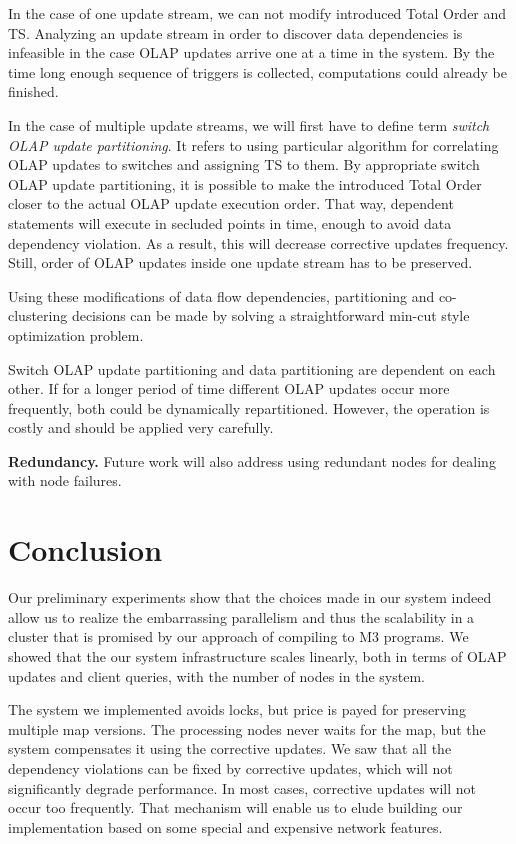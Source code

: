\documentclass{sig-semester}
\def\OLAP{OLAP\xspace}
\def\EXORD{actual OLAP update execution order\xspace}
\begin{document}
In the case of one update stream, we can not modify introduced Total Order and TS. Analyzing an update stream in order to discover data dependencies is infeasible in the case \OLAP updates arrive one at a time in the system. By the time long enough sequence of triggers is collected, computations could already be finished.

In the case of multiple update streams, we will first have to define term \textit{switch \OLAP update partitioning}. It refers to using particular algorithm for correlating \OLAP updates to switches and assigning TS to them. By appropriate switch \OLAP update partitioning, it is possible to make the introduced Total Order closer to the \EXORD. That way, dependent statements will execute in secluded points in time, enough to avoid data dependency violation. As a result, this will decrease corrective updates frequency. Still, order of \OLAP updates inside one update stream has to be preserved.

Using these modifications of data flow dependencies, partitioning and co-clustering decisions can be made by solving a straightforward min-cut style optimization problem.

Switch \OLAP update partitioning and data partitioning are dependent on each other. If for a longer period of time different \OLAP updates occur more frequently, both could be dynamically repartitioned. However, the operation is costly and should be applied very carefully.

\textbf{Redundancy.} Future work will also address using redundant nodes for dealing with node failures. 

\section{Conclusion}
\label{sec:Conclusion}
\vspace{2mm}

Our preliminary experiments show that the choices made in our
system indeed allow us to realize the embarrassing parallelism and
thus the scalability in a cluster that is promised by our approach of
compiling to M3 programs.  We showed that the our system infrastructure scales linearly, both in terms of \OLAP updates and client queries, with the number of nodes in the system.

The system we implemented avoids locks, but price is payed for preserving multiple map versions. The processing nodes never waits for the map, but the system compensates it using the corrective updates. We saw that all the dependency violations can be fixed by corrective updates, which will not significantly degrade performance. In most cases, corrective updates will not occur too frequently. That mechanism will enable us to elude building our implementation based on some special and expensive network features.

{


}

\newpage
\end{document}
